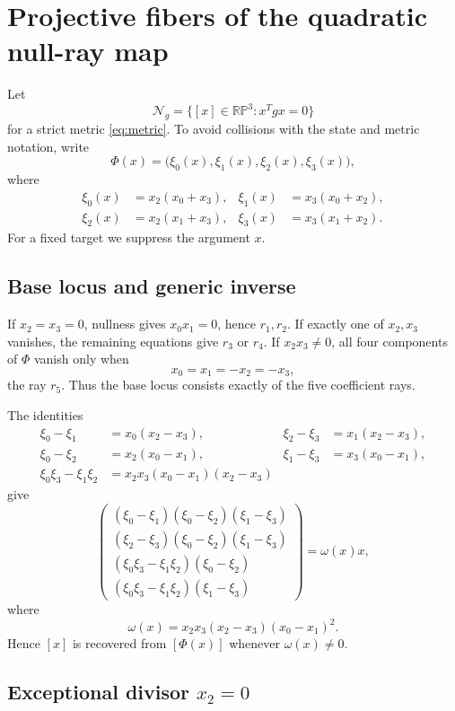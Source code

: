 \section{Projective fibers of the quadratic null-ray map}
\label{app:fibers}

Let
\[
\mathcal N_g=\{[x]\in\mathbb{RP}^3:x^Tgx=0\}
\]
for a strict metric \eqref{eq:metric}. To avoid collisions with the state and
metric notation, write
\[
\Phi(x)=
\bigl(\xi_0(x),\xi_1(x),\xi_2(x),\xi_3(x)\bigr),
\]
where
\[
\begin{aligned}
\xi_0(x)&=x_2(x_0+x_3),&
\xi_1(x)&=x_3(x_0+x_2),\\
\xi_2(x)&=x_2(x_1+x_3),&
\xi_3(x)&=x_3(x_1+x_2).
\end{aligned}
\]
For a fixed target we suppress the argument \(x\).

\subsection{Base locus and generic inverse}

If \(x_2=x_3=0\), nullness gives \(x_0x_1=0\), hence \(r_1,r_2\).
If exactly one of \(x_2,x_3\) vanishes, the remaining equations give
\(r_3\) or \(r_4\). If \(x_2x_3\ne0\), all four components of \(\Phi\)
vanish only when
\[
x_0=x_1=-x_2=-x_3,
\]
the ray \(r_5\). Thus the base locus consists exactly of the five coefficient
rays.

The identities
\[
\begin{aligned}
\xi_0-\xi_1&=x_0(x_2-x_3),&
\xi_2-\xi_3&=x_1(x_2-x_3),\\
\xi_0-\xi_2&=x_2(x_0-x_1),&
\xi_1-\xi_3&=x_3(x_0-x_1),\\
\xi_0\xi_3-\xi_1\xi_2
&=x_2x_3(x_0-x_1)(x_2-x_3)
\end{aligned}
\]
give
\[
\begin{pmatrix}
(\xi_0-\xi_1)(\xi_0-\xi_2)(\xi_1-\xi_3)\\
(\xi_2-\xi_3)(\xi_0-\xi_2)(\xi_1-\xi_3)\\
(\xi_0\xi_3-\xi_1\xi_2)(\xi_0-\xi_2)\\
(\xi_0\xi_3-\xi_1\xi_2)(\xi_1-\xi_3)
\end{pmatrix}
=\omega(x)x,
\]
where
\[
\omega(x)=x_2x_3(x_2-x_3)(x_0-x_1)^2.
\]
Hence \([x]\) is recovered from \([\Phi(x)]\) whenever \(\omega(x)\ne0\).

\subsection[Exceptional divisor x2=0]{Exceptional divisor \(x_2=0\)}

